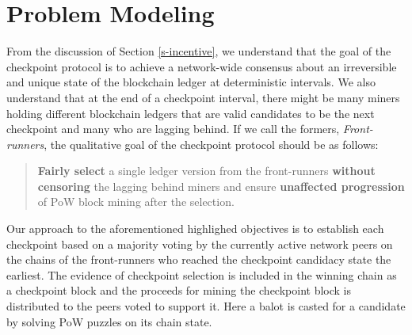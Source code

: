 
\section{Problem Modeling}
\label{s-model}
From the discussion of Section \ref{s-incentive}, we understand that the goal of the checkpoint protocol is to achieve a network-wide consensus about an irreversible and unique state of the blockchain ledger at deterministic intervals. We also understand that at the end of a checkpoint interval, there might be many miners holding different blockchain ledgers that are valid candidates to be the next checkpoint and many who are lagging behind. If we call the formers, \textit{Front-runners}, the qualitative goal of the checkpoint protocol should be as follows:

\begin{quote}
\textbf{Fairly select} a single ledger version from the front-runners \textbf{without censoring} the lagging behind miners and ensure \textbf{unaffected progression} of PoW block mining after the selection.  
\end{quote}

Our approach to the aforementioned highlighed objectives is to establish each checkpoint based on a majority voting by the currently active network peers on the chains of the front-runners who reached the checkpoint candidacy state the earliest. The evidence of checkpoint selection is included in the winning chain as a checkpoint block and the proceeds for mining the checkpoint block is distributed to the peers voted to support it. Here a balot is casted for a candidate by solving PoW puzzles on its chain state.

